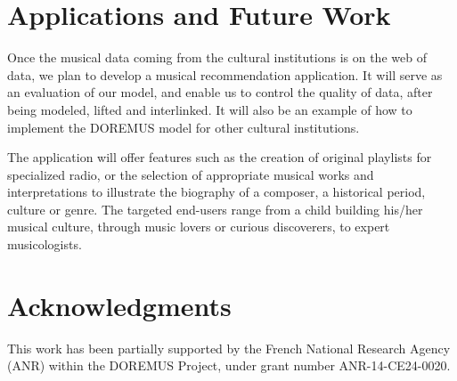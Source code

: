 \documentclass{llncs}
\begin{document}
\section{Applications and Future Work}
\label{sec:applications}
Once the musical data coming from the cultural institutions is on the web of data, we plan to develop a musical recommendation application. It will serve as an evaluation of our model, and enable us to control the quality of data, after being modeled, lifted and interlinked. It will also be an example of how to implement the DOREMUS model for other cultural institutions.

The application will offer features such as the creation of original playlists for specialized radio, or the selection of appropriate musical works and interpretations to illustrate the biography of a composer, a historical period, culture or genre. The targeted end-users range from a child building his/her musical culture, through music lovers or curious discoverers, to expert musicologists.


\section*{Acknowledgments}
This work has been partially supported by the French National Research Agency (ANR) within the DOREMUS Project, under grant number ANR-14-CE24-0020.



\end{document}
